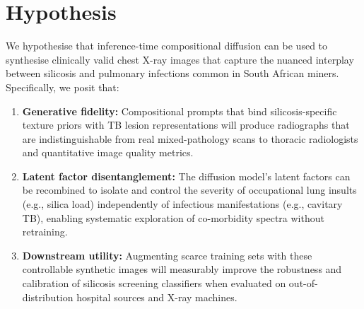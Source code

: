 \section{Hypothesis}
We hypothesise that inference-time compositional diffusion can be used to synthesise clinically valid chest X-ray images that capture the nuanced interplay between silicosis and pulmonary infections common in South African miners. Specifically, we posit that:

\begin{enumerate}
    \item \textbf{Generative fidelity:} Compositional prompts that bind silicosis-specific texture priors with TB lesion representations will produce radiographs that are indistinguishable from real mixed-pathology scans to thoracic radiologists and quantitative image quality metrics.
    \item \textbf{Latent factor disentanglement:} The diffusion model's latent factors can be recombined to isolate and control the severity of occupational lung insults (e.g., silica load) independently of infectious manifestations (e.g., cavitary TB), enabling systematic exploration of co-morbidity spectra without retraining.
    \item \textbf{Downstream utility:} Augmenting scarce training sets with these controllable synthetic images will measurably improve the robustness and calibration of silicosis screening classifiers when evaluated on out-of-distribution hospital sources and X-ray machines.
\end{enumerate}